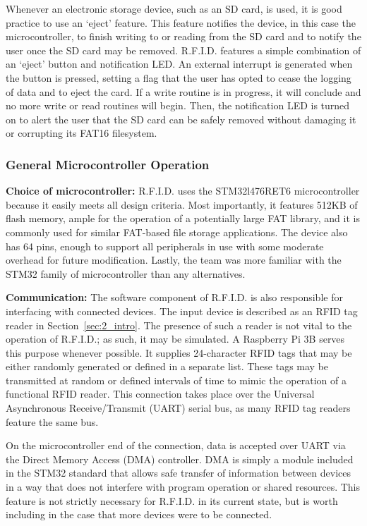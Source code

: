 Whenever an electronic storage device, such as an SD card, is used, it is good practice to use an `eject' feature. This feature notifies the device, in this case the microcontroller, to finish writing to or reading from the SD card and to notify the user once the SD card may be removed. R.F.I.D. features a simple combination of an `eject' button and notification LED. An external interrupt is generated when the button is pressed, setting a flag that the user has opted to cease the logging of data and to eject the card. If a write routine is in progress, it will conclude and no more write or read routines will begin. Then, the notification LED is turned on to alert the user that the SD card can be safely removed without damaging it or corrupting its FAT16 filesystem.

\subsubsection{General Microcontroller Operation}
\textbf{Choice of microcontroller:} R.F.I.D. uses the STM32l476RET6 microcontroller because it easily meets all design criteria. Most importantly, it features 512KB of flash memory, ample for the operation of a potentially large FAT library, and it is commonly used for similar FAT-based file storage applications. The device also has 64 pins, enough to support all peripherals in use with some moderate overhead for future modification. Lastly, the team was more familiar with the STM32 family of microcontroller than any alternatives.

\textbf{Communication:} The software component of R.F.I.D. is also responsible for interfacing with connected devices. The input device is described as an RFID tag reader in Section~\ref{sec:2_intro}. The presence of such a reader is not vital to the operation of R.F.I.D.; as such, it may be simulated. A Raspberry Pi 3B serves this purpose whenever possible. It supplies 24-character RFID tags that may be either randomly generated or defined in a separate list. These tags may be transmitted at random or defined intervals of time to mimic the operation of a functional RFID reader. This connection takes place over the Universal Asynchronous Receive/Transmit (UART) serial bus, as many RFID tag readers feature the same bus.

On the microcontroller end of the connection, data is accepted over UART via the Direct Memory Access (DMA) controller. DMA is simply a module included in the STM32 standard that allows safe transfer of information between devices in a way that does not interfere with program operation or shared resources. This feature is not strictly necessary for R.F.I.D. in its current state, but is worth including in the case that more devices were to be connected. 

